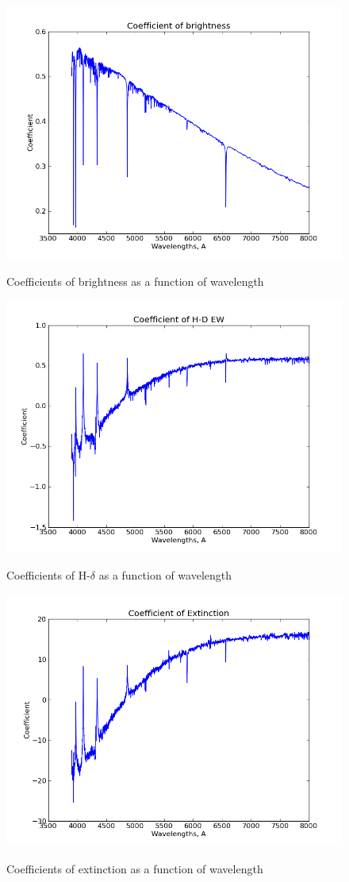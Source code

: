 \documentclass[preprint]{aastex}
\begin{document}
\begin{figure}
\includegraphics[width=12cm]{coeffs0}\\
\caption{Coefficients of brightness as a function of wavelength}
\end{figure}
\begin{figure}
\includegraphics[width=12cm]{coeffs1}\\
\caption{Coefficients of H-$\delta$ as a function of wavelength}
\end{figure}
\begin{figure}
\includegraphics[width=12cm]{coeffs2}\\
\caption{Coefficients of extinction as a function of wavelength}
\end{figure}
\end{document}
